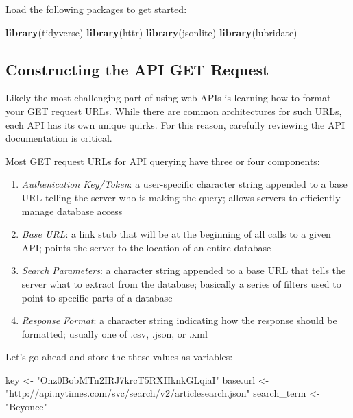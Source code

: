\documentclass[]{book}
\newenvironment{Shaded}{\begin{snugshade}}{\end{snugshade}}
\newcommand{\KeywordTok}[1]{\textcolor[rgb]{0.13,0.29,0.53}{\textbf{#1}}}
\newcommand{\NormalTok}[1]{#1}
\newcommand{\StringTok}[1]{\textcolor[rgb]{0.31,0.60,0.02}{#1}}
\begin{document}
Load the following packages to get started:

\begin{Shaded}
\begin{Highlighting}[]
\KeywordTok{library}\NormalTok{(tidyverse)}
\KeywordTok{library}\NormalTok{(httr)}
\KeywordTok{library}\NormalTok{(jsonlite)}
\KeywordTok{library}\NormalTok{(lubridate)}
\end{Highlighting}
\end{Shaded}

\hypertarget{constructing-the-api-get-request}{%
\subsection{Constructing the API GET Request}\label{constructing-the-api-get-request}}

Likely the most challenging part of using web APIs is learning how to format your GET request URLs. While there are common architectures for such URLs, each API has its own unique quirks. For this reason, carefully reviewing the API documentation is critical.

Most GET request URLs for API querying have three or four components:

\begin{enumerate}
\def\labelenumi{\arabic{enumi}.}
\item
  \emph{Authenication Key/Token}: a user-specific character string appended to a base URL telling the server who is making the query; allows servers to efficiently manage database access
\item
  \emph{Base URL}: a link stub that will be at the beginning of all calls to a given API; points the server to the location of an entire database
\item
  \emph{Search Parameters}: a character string appended to a base URL that tells the server what to extract from the database; basically a series of filters used to point to specific parts of a database
\item
  \emph{Response Format}: a character string indicating how the response should be formatted; usually one of .csv, .json, or .xml
\end{enumerate}

Let's go ahead and store the these values as variables:

\begin{Shaded}
\begin{Highlighting}[]
\NormalTok{key <-}\StringTok{ "Onz0BobMTn2IRJ7krcT5RXHknkGLqiaI"}
\NormalTok{base.url <-}\StringTok{ "http://api.nytimes.com/svc/search/v2/articlesearch.json"}
\NormalTok{search_term <-}\StringTok{ "Beyonce"}
\end{Highlighting}
\end{Shaded}
\end{document}

